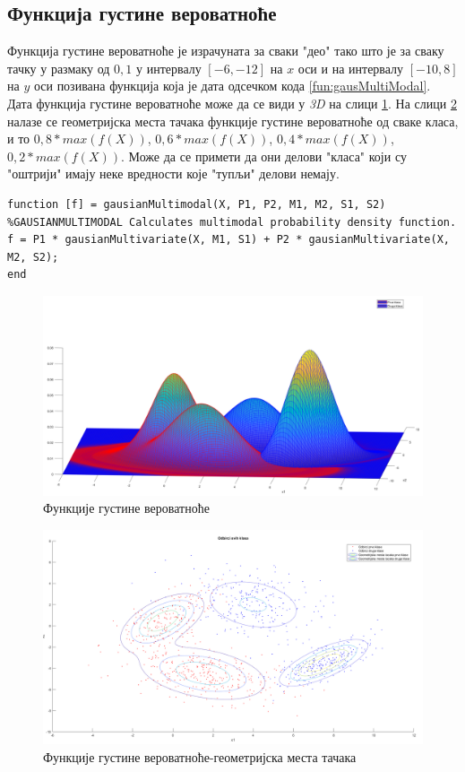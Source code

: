 \newpage
\subsection{Функција густине вероватноће}
Функција густине вероватноће је израчуната за сваки "део" тако што је за сваку тачку у размаку од $0,1$ у интервалу $[-6, -12]$ на $x$ оси и на интервалу $[-10, 8]$ на $y$ оси позивана функција која је дата одсечком кода \ref{fun:gausMultiModal}. Дата функција густине вероватноће може да се види у \emph{3D} на слици \ref{fig:FGV}. На слици \ref{fig:FGVContour} налазе се геометријска места тачака функције густине вероватноће од сваке класа, и то $0,8 * max(f(X))$, $0,6 * max(f(X))$, $0,4 * max(f(X))$, $0,2 * max(f(X))$. Може да се примети да они делови "класа" који су "оштрији" имају неке вредности које "тупљи" делови немају.

\begin{lstlisting}[caption={Вишеваријабална мултимодална Гаусова расподела-функција густине},label={fun:gausMultiModal}]
function [f] = gausianMultimodal(X, P1, P2, M1, M2, S1, S2)
%GAUSIANMULTIMODAL Calculates multimodal probability density function.
f = P1 * gausianMultivariate(X, M1, S1) + P2 * gausianMultivariate(X, M2, S2); 
end
\end{lstlisting}

\begin{figure}[htb!]
\includegraphics[scale=0.33]{pictures/2/FGV}
\caption{Функције густине вероватноће}\label{fig:FGV}
\end{figure}

\begin{figure}[htb!]
\includegraphics[scale=0.33]{pictures/2/FGVContour}
\caption{Функције густине вероватноће-геометријска места тачака}\label{fig:FGVContour}
\end{figure}
\newpage
